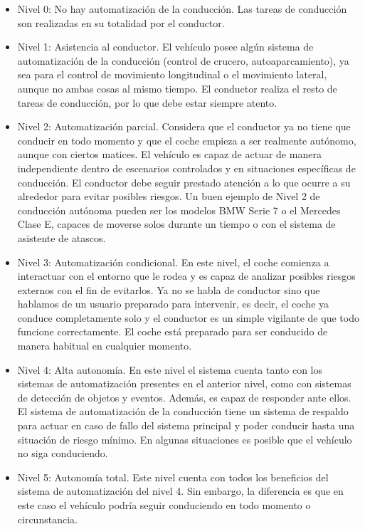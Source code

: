 \begin{itemize}
    \item Nivel 0: No hay automatización de la conducción. Las tareas de conducción son realizadas en su totalidad por el conductor.
    
    \item Nivel 1: Asistencia al conductor. El vehículo posee algún sistema de automatización de la conducción (control de crucero, autoaparcamiento), ya sea para el control de movimiento longitudinal o el movimiento lateral, aunque no ambas cosas al mismo tiempo. El conductor realiza el resto de tareas de conducción, por lo que debe estar siempre atento.
    
    \item Nivel 2: Automatización parcial. Considera que el conductor ya no tiene que conducir en todo momento y que el coche empieza a ser realmente autónomo, aunque con ciertos matices. El vehículo es capaz de actuar de manera independiente dentro de escenarios controlados y en situaciones específicas de conducción. El conductor debe seguir prestado atención a lo que ocurre a su alrededor para evitar posibles riesgos. Un buen ejemplo de Nivel 2 de conducción autónoma pueden ser los modelos BMW Serie 7 o el Mercedes Clase E, capaces de moverse solos durante un tiempo o con el sistema de asistente de atascos.
    
    \item Nivel 3: Automatización condicional. En este nivel, el coche comienza a interactuar con el entorno que le rodea y es capaz de analizar posibles riesgos externos con el fin de evitarlos. Ya no se habla de conductor sino que hablamos de un usuario preparado para intervenir, es decir, el coche ya conduce completamente solo y el conductor es un simple vigilante de que todo funcione correctamente. El coche está preparado para ser conducido de manera habitual en cualquier momento.
    
    \item Nivel 4: Alta autonomía. En este nivel el sistema cuenta tanto con los sistemas de automatización presentes en el anterior nivel, como con sistemas de detección de objetos y eventos. Además, es capaz de responder ante ellos. El sistema de automatización de la conducción tiene un sistema de respaldo para actuar en caso de fallo del sistema principal y poder conducir hasta una situación de riesgo mínimo. En algunas situaciones es posible que el vehículo no siga conduciendo.
    
    \item Nivel 5: Autonomía total. Este nivel cuenta con todos los beneficios del sistema de automatización del nivel 4. Sin embargo, la diferencia es que en este caso el vehículo podría seguir conduciendo en todo momento o circunstancia.
\end{itemize}

